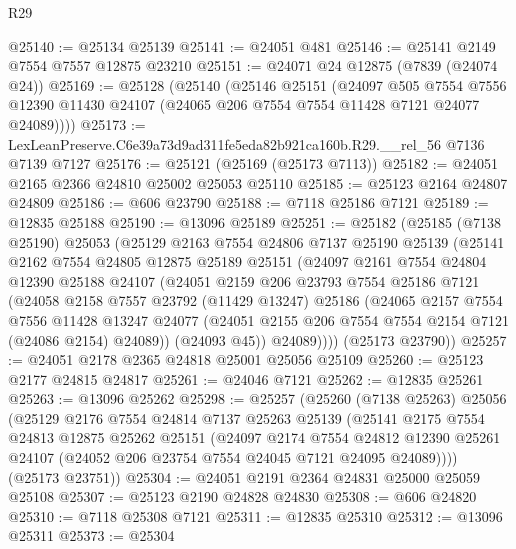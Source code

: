 \begin{lexlean}{R29}
\begin{coremodule}
@25140 := @25134 @25139
@25141 := @24051 @481
@25146 := @25141 @2149 @7554 @7557 @12875 @23210
@25151 := @24071 @24 @12875 (@7839 (@24074 @24))
@25169 := @25128
    (@25140
      (@25146
        @25151
        (@24097
          @505
          @7554
          @7556
          @12390
          @11430
          @24107
          (@24065 @206 @7554 @7554 @11428 @7121 @24077 @24089))))
@25173 := LexLeanPreserve.C6e39a73d9ad311fe5eda82b921ca160b.R29.__rel_56 @7136 @7139 @7127
@25176 := @25121 (@25169 (@25173 @7113))
@25182 := @24051 @2165 @2366 @24810 @25002 @25053 @25110
@25185 := @25123 @2164 @24807 @24809
@25186 := @606 @23790
@25188 := @7118 @25186 @7121
@25189 := @12835 @25188
@25190 := @13096 @25189
@25251 := @25182
    (@25185
      (@7138 @25190)
      @25053
      (@25129
        @2163
        @7554
        @24806
        @7137
        @25190
        @25139
        (@25141
          @2162
          @7554
          @24805
          @12875
          @25189
          @25151
          (@24097
            @2161
            @7554
            @24804
            @12390
            @25188
            @24107
            (@24051
              @2159
              @206
              @23793
              @7554
              @25186
              @7121
              (@24058
                @2158
                @7557
                @23792
                (@11429 @13247)
                @25186
                (@24065
                  @2157
                  @7554
                  @7556
                  @11428
                  @13247
                  @24077
                  (@24051 @2155 @206 @7554 @7554 @2154 @7121 (@24086 @2154) @24089))
                (@24093 @45))
              @24089))))
      (@25173 @23790))
@25257 := @24051 @2178 @2365 @24818 @25001 @25056 @25109
@25260 := @25123 @2177 @24815 @24817
@25261 := @24046 @7121
@25262 := @12835 @25261
@25263 := @13096 @25262
@25298 := @25257
    (@25260
      (@7138 @25263)
      @25056
      (@25129
        @2176
        @7554
        @24814
        @7137
        @25263
        @25139
        (@25141
          @2175
          @7554
          @24813
          @12875
          @25262
          @25151
          (@24097
            @2174
            @7554
            @24812
            @12390
            @25261
            @24107
            (@24052 @206 @23754 @7554 @24045 @7121 @24095 @24089))))
      (@25173 @23751))
@25304 := @24051 @2191 @2364 @24831 @25000 @25059 @25108
@25307 := @25123 @2190 @24828 @24830
@25308 := @606 @24820
@25310 := @7118 @25308 @7121
@25311 := @12835 @25310
@25312 := @13096 @25311
@25373 := @25304

\end{coremodule}
\end{lexlean}
